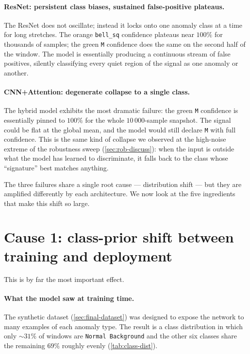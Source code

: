 \paragraph{ResNet: persistent class biases, sustained false-positive plateaus.}
The ResNet does not oscillate; instead it locks onto one anomaly class
at a time for long stretches. The orange \texttt{bell\_sq} confidence
plateaus near $100\%$ for thousands of samples; the green \texttt{M}
confidence does the same on the second half of the window. The model
is essentially producing a continuous stream of false positives,
silently classifying every quiet region of the signal as one anomaly
or another.

\paragraph{CNN+Attention: degenerate collapse to a single class.}
The hybrid model exhibits the most dramatic failure: the green
\texttt{M} confidence is essentially pinned to $100\%$ for the whole
$10\,000$-sample snapshot. The signal could be flat at the global
mean, and the model would still declare \texttt{M} with full
confidence. This is the same kind of collapse we observed at the
high-noise extreme of the robustness sweep (\cref{sec:rob-discuss}):
when the input is outside what the model has learned to discriminate,
it falls back to the class whose ``signature'' best matches anything.

The three failures share a single root cause --- distribution shift ---
but they are amplified differently by each architecture. We now look
at the five ingredients that make this shift so large.

\section{Cause 1: class-prior shift between training and deployment}
\label{sec:fail-prior}

This is by far the most important effect.

\paragraph{What the model saw at training time.}
The synthetic dataset (\cref{sec:final-dataset}) was designed to
expose the network to many examples of each anomaly type. The result
is a class distribution in which only $\sim 31\%$ of windows are
\texttt{Normal Background} and the other six classes share the
remaining $69\%$ roughly evenly (\cref{tab:class-dist}).

